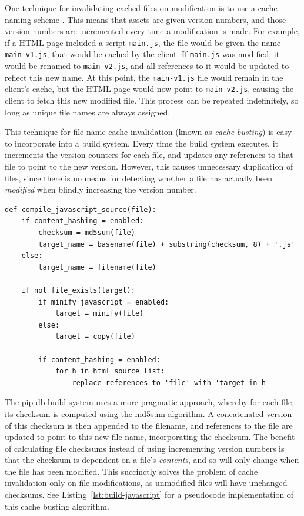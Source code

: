 One technique for invalidating cached files on modification is to use
a cache naming scheme \cite{kelly2002optimization}. This means that
assets are given version numbers, and those version numbers are
incremented every time a modification is made. For example, if a HTML
page included a script \texttt{main.js}, the file would be given the
name \texttt{main-v1.js}, that would be cached by the client. If
\texttt{main.js} was modified, it would be renamed to
\texttt{main-v2.js}, and all references to it would be updated to
reflect this new name. At this point, the \texttt{main-v1.js} file
would remain in the client's cache, but the HTML page would now point
to \texttt{main-v2.js}, causing the client to fetch this new modified
file. This process can be repeated indefinitely, so long as unique
file names are always assigned.

This technique for file name cache invalidation (known as
\textit{cache busting}) is easy to incorporate into a build
system. Every time the build system executes, it increments the
version counters for each file, and updates any references to that
file to point to the new version. However, this causes unnecessary
duplication of files, since there is no means for detecting whether a
file has actually been \textit{modified} when blindly increasing the
version number.

\newpage
\lstset{language=python}
\begin{lstlisting}[label=lst:build-javascript,caption={
      [Pseudocode for compiling a JavaScript source]
       Pseudocode listing for compiling a JavaScript source, with
       optional content hashing and minification.}]
def compile_javascript_source(file):
    if content_hashing = enabled:
        checksum = md5sum(file)
        target_name = basename(file) + substring(checksum, 8) + '.js'
    else:
        target_name = filename(file)

    if not file_exists(target):
        if minify_javascript = enabled:
            target = minify(file)
        else:
            target = copy(file)

        if content_hashing = enabled:
            for h in html_source_list:
                replace references to 'file' with 'target in h
\end{lstlisting}

The pip-db build system uses a more pragmatic approach, whereby for
each file, its checksum is computed using the md5sum algorithm. A
concatenated version of this checksum is then appended to the
filename, and references to the file are updated to point to this new
file name, incorporating the checksum. The benefit of calculating file
checksums instead of using incrementing version numbers is that the
checksum is dependent on a file's \textit{contents}, and so will only
change when the file has been modified. This succinctly solves the
problem of cache invalidation only on file modifications, as
unmodified files will have unchanged checksums. See
Listing~\ref{lst:build-javascript} for a pseudocode implementation of
this cache busting algorithm.

